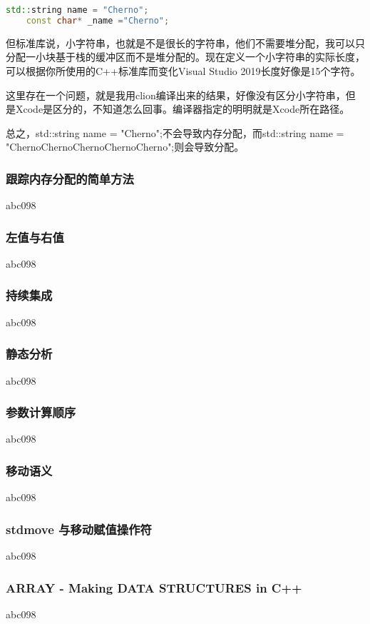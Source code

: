 \begin{lstlisting}[language=c++]
	std::string name = "Cherno";
    const char* _name ="Cherno";
\end{lstlisting}


但标准库说，小字符串，也就是不是很长的字符串，他们不需要堆分配，我可以只分配一小块基于栈的缓冲区而不是堆分配的。现在定义一个小字符串的实际长度，可以根据你所使用的C++标准库而变化Visual Studio 2019长度好像是15个字符。

这里存在一个问题，就是我用clion编译出来的结果，好像没有区分小字符串，但是Xcode是区分的，不知道怎么回事。编译器指定的明明就是Xcode所在路径。

总之，{\ncodestyle std::string name = "Cherno";}不会导致内存分配，而{\ncodestyle  std::string name = "ChernoChernoChernoChernoCherno";}则会导致分配。

\subsubsection{跟踪内存分配的简单方法}
abc098
\subsubsection{左值与右值}
abc098
\subsubsection{持续集成}
abc098
\subsubsection{静态分析}
abc098
\subsubsection{参数计算顺序}
abc098
\subsubsection{移动语义}
abc098

\subsubsection{ stdmove 与移动赋值操作符}
abc098


\subsubsection{ ARRAY - Making DATA STRUCTURES in C++}
abc098
